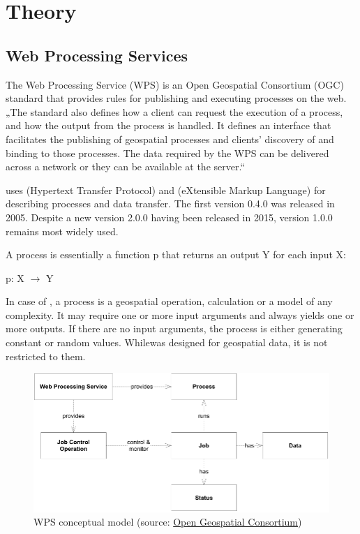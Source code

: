 \chapter{Theory}
\label{2-teorie}

\section{Web Processing Services}

The Web Processing Service (WPS) is an Open Geospatial
Consortium (OGC) standard that provides rules for publishing and
executing processes on the web. „The standard also defines how a
client can request the execution of a process, and how the output from
the process is handled. It defines an interface that facilitates the
publishing of geospatial processes and clients’ discovery of and
binding to those processes. The data required by the WPS can be
delivered across a network or they can be available at the server.“
\cite{wpsstandard}


 uses  (Hypertext Transfer Protocol) and  (eXtensible Markup Language) for describing
processes and data transfer. The first version 0.4.0 was released in
2005. Despite a new version 2.0.0 having been released in 2015,
version 1.0.0 remains most widely used.

A process is essentially a function p that returns an output Y for
each input X:\\ \centerline{p: X $\rightarrow$ Y}

In case of , a process is a geospatial operation, calculation or a
model of any complexity. It may require one or more input arguments
and always yields one or more outputs. If there are no input
arguments, the process is either generating constant or random
values. Whilewas designed for geospatial data, it is not
restricted to them.

\begin{figure}[H] \centering
  \includegraphics[width=400pt]{./pictures/wps_conceptual_model.png}
      \caption[QGIS logo]{WPS conceptual model (source: \href{http://docs.opengeospatial.org/is/14-065/14-065.html\#10}{Open Geospatial Consortium})}
      \label{fig:WPS}
  \end{figure}

